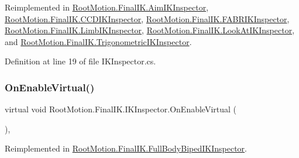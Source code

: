 Reimplemented in \mbox{\hyperlink{class_root_motion_1_1_final_i_k_1_1_aim_i_k_inspector_a49f6b6386293ca03782ebd2b9394494e}{Root\+Motion.\+Final\+I\+K.\+Aim\+I\+K\+Inspector}}, \mbox{\hyperlink{class_root_motion_1_1_final_i_k_1_1_c_c_d_i_k_inspector_a38d0e00d987c69c86bbb08fddc35336e}{Root\+Motion.\+Final\+I\+K.\+C\+C\+D\+I\+K\+Inspector}}, \mbox{\hyperlink{class_root_motion_1_1_final_i_k_1_1_f_a_b_r_i_k_inspector_a6a86f10a812820a3857c7d9a0c21a1b9}{Root\+Motion.\+Final\+I\+K.\+F\+A\+B\+R\+I\+K\+Inspector}}, \mbox{\hyperlink{class_root_motion_1_1_final_i_k_1_1_limb_i_k_inspector_a0811b1bc9ecabe082219a89830c086b2}{Root\+Motion.\+Final\+I\+K.\+Limb\+I\+K\+Inspector}}, \mbox{\hyperlink{class_root_motion_1_1_final_i_k_1_1_look_at_i_k_inspector_ad277b6a27244d6d7f71323ff324411a7}{Root\+Motion.\+Final\+I\+K.\+Look\+At\+I\+K\+Inspector}}, and \mbox{\hyperlink{class_root_motion_1_1_final_i_k_1_1_trigonometric_i_k_inspector_a164e4136ae40980590ea2d284d10a1e8}{Root\+Motion.\+Final\+I\+K.\+Trigonometric\+I\+K\+Inspector}}.



Definition at line 19 of file I\+K\+Inspector.\+cs.

\mbox{\label{class_root_motion_1_1_final_i_k_1_1_i_k_inspector_a462bc6acec264d59597f3c6a211f179f}} 
\subsubsection{\texorpdfstring{On\+Enable\+Virtual()}{OnEnableVirtual()}}
{\footnotesize\ttfamily virtual void Root\+Motion.\+Final\+I\+K.\+I\+K\+Inspector.\+On\+Enable\+Virtual (\begin{DoxyParamCaption}{ }\end{DoxyParamCaption})\hspace{0.3cm}{\ttfamily [protected]}, {\ttfamily [virtual]}}



Reimplemented in \mbox{\hyperlink{class_root_motion_1_1_final_i_k_1_1_full_body_biped_i_k_inspector_aabfeb6f3917b1ba7fb58725b9ea11a3a}{Root\+Motion.\+Final\+I\+K.\+Full\+Body\+Biped\+I\+K\+Inspector}}.



